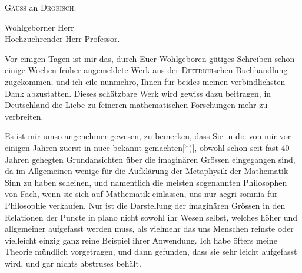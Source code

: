 \begin{center}\large\textsc{Gauss} an \textsc{Drobisch}.\end{center}
\begin{center}Wohlgeborner Herr\\Hochzuehrender Herr Professor.\end{center}
\noindent\hspace*{\parindent}Vor einigen Tagen ist mir das, durch Euer Wohlgeboren gütiges Schreiben
schon einige Wochen früher angemeldete Werk aus der \textsc{Dietrich}schen Buchhandlung zugekommen,
und ich eile nunmehro, Ihnen für beides meinen verbindlichsten Dank abzustatten.
Dieses schätzbare Werk wird gewiss dazu beitragen, in Deutschland die Liebe zu feineren
mathematischen Forschungen mehr zu verbreiten.

Es ist mir umso angenehmer gewesen, zu bemerken, dass Sie in die von mir vor einigen Jahren
zuerst in nuce bekannt gemachten[*)], obwohl schon seit fast 40 Jahren gehegten Grundansichten
über die imaginären Grössen eingegangen sind, da im Allgemeinen wenige für die Aufklärung der
Metaphysik der Mathematik Sinn zu haben scheinen, und namentlich die meisten sogenannten
Philosophen von Fach, wenn sie sich auf Mathematik einlassen, uns nur aegri somnia für Philosophie
verkaufen. Nur ist die Darstellung der imaginären Grössen in den Relationen der Puncte in plano
nicht sowohl ihr Wesen selbst, welches höher und allgemeiner aufgefasst werden muss, als vielmehr
das uns Menschen reinste oder vielleicht einzig ganz reine Beispiel ihrer Anwendung. Ich habe
öfters meine Theorie mündlich vorgetragen, und dann gefunden, dass sie sehr leicht aufgefasst
wird, und gar nichts abstruses behält.

